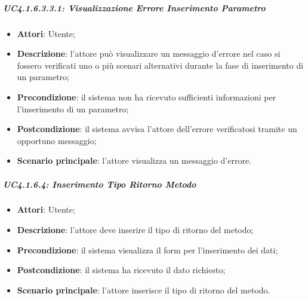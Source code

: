 \subparagraph{UC4.1.6.3.3.1: Visualizzazione Errore Inserimento Parametro }
\label{UC4.1.6.3.3.1}
\begin{itemize}
\item \textbf{Attori}: Utente;
\item \textbf{Descrizione}: l'attore può visualizzare un messaggio d'errore nel caso si fossero verificati uno o più scenari alternativi durante la fase di inserimento di un parametro;	
\item \textbf{Precondizione}: il sistema non ha ricevuto sufficienti informazioni per l'inserimento di un parametro;	
\item \textbf{Postcondizione}: il sistema avvisa l'attore dell'errore verificatosi tramite un opportuno messaggio;	
\item \textbf{Scenario principale}:
l'attore visualizza un messaggio d'errore.	
\end{itemize}

\subparagraph{UC4.1.6.4: Inserimento Tipo Ritorno Metodo}
\label{UC4.1.6.4}
\begin{itemize}
\item \textbf{Attori}: Utente;
\item \textbf{Descrizione}: l'attore deve inserire il tipo di ritorno del metodo;
\item \textbf{Precondizione}: il sistema visualizza il form per l'inserimento dei dati;
\item \textbf{Postcondizione}: il sistema ha ricevuto il dato richiesto;
\item \textbf{Scenario principale}:
l'attore inserisce il tipo di ritorno del metodo.
\end{itemize}

